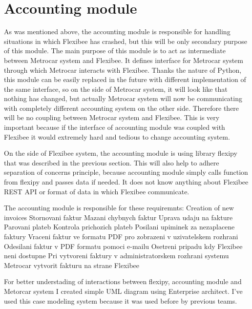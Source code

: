 \documentclass[11pt,twoside,a4paper]{book}
\begin{document}
\section{Accounting module}
As was mentioned above, the accounting module is responsible for handling situations in which Flexibee has crashed, but this will be only secondary purpose of this module. The main purpose of this module is to act as intermediate between Metrocar system and Flexibee. It defines interface for Metrocar system through which Metrocar interacts with Flexibee. Thanks the nature of Python, this module can be easily replaced in the future with different implementation of the same interface, so on the side of Metrocar system, it will look like that nothing has changed, but actually Metrocar system will now be communicating with completely different accounting system on the other side. Therefore there will be no coupling between Metrocar system and Flexibee. This is very important because if the interface of accounting module was coupled with Flexibee it would extremely hard and tedious to change accounting system. 

On the side of Flexibee system, the accounting module is using library flexipy that was described in the previous section. This will also help to adhere separation of concerns principle\cite{wiki:soc}, because accounting module simply calls function from flexipy and passes data if needed. It does not know anything about Flexibee REST API or format of data in which Flexibee communicate. 

The accounting module is responsible for these requiremnts:
Creation of new invoices
Stornovani faktur
Mazani chybnych faktur
Uprava udaju na fakture
Parovani plateb
Kontrola prichozich plateb
Posilani upiminek za nezaplacene faktury
Vraceni faktur ve formatu PDF pro zobrazeni v uzivatelskem rozhrani
Odesilani faktur v PDF formatu pomoci e-mailu
Osetreni pripadu kdy Flexibee neni dostupne
Pri vytvoreni faktury v administratorskem rozhrani systemu Metrocar vytvorit fakturu na strane Flexibee

For better understading of interactions between flexipy, accounting module and Metorcar system I created simple UML diagram using Enterprise architect. I've used this case modeling system because it was used before by previous teams.

\end{document}
